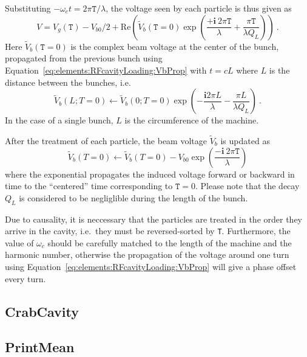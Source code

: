 \documentclass[a4paper]{report}
\begin{document}
Substituting $-\omega_c t = 2\pi \mathtt{T} / \lambda$, the voltage seen by each particle is thus given as
\begin{equation}
  V = V_g(\mathtt{T}) - V_{b0}/2 + \mathrm{Re}\left( \tilde V_b(\mathtt{T}=0) \exp\left(\frac{+\mathbf{i}~2\pi \mathtt{T}}{\lambda} + \frac{\pi \mathtt{T}}{\lambda Q_L} \right) \right)~.
\end{equation}
Here $\tilde V_b(\mathtt{T}=0)$ is the complex beam voltage at the center of the bunch, propagated from the previous bunch using Equation~\eqref{eq:elements:RFcavityLoading:VbProp} with $t=cL$ where $L$ is the distance between the bunches, i.e.\
\begin{equation}
  \tilde V_b(L;T=0) \leftarrow  \tilde V_{b}(0;T=0) \exp\left(-\frac{\mathbf{i} 2\pi L}{\lambda} - \frac{\pi L }{\lambda Q_L} \right)~.
\end{equation}
In the case of a single bunch, $L$ is the circumference of the machine.

After the treatment of each particle, the beam voltage $\tilde V_b$ is updated as
\begin{equation}
  \tilde V_b(T=0) \leftarrow \tilde V_b(T=0) - V_{b0} \exp \left( \frac{- \mathbf{i} ~ 2\pi \mathtt{T}}{\lambda}  \right) 
\end{equation}
where the exponential propagates the induced voltage forward or backward in time to the ``centered'' time corresponding to $\mathtt{T}=0$.
Please note that the decay $Q_L$ is considered to be negliglible during the length of the bunch.

Due to causality, it is neccessary that the particles are treated in the order they arrive in the cavity, i.e.\ they must be reversed-sorted by \texttt{T}.
Furthermore, the value of $\omega_c$ should be carefully matched to the length of the machine and the harmonic number, otherwise the propagation of the voltage around one turn using Equation~\eqref{eq:elements:RFcavityLoading:VbProp} will give a phase offset every turn.



\subsection{CrabCavity}
\subsection{PrintMean}
\end{document}
